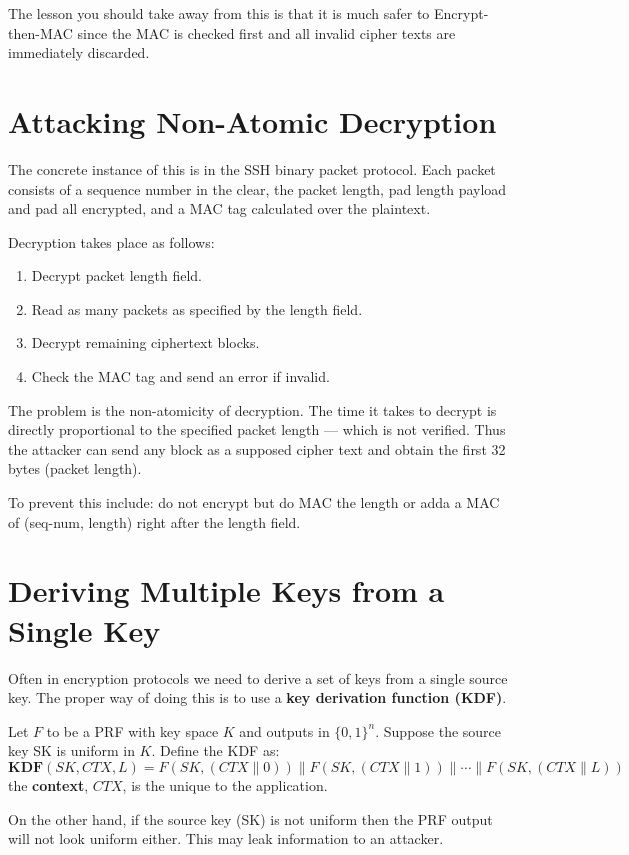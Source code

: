 \documentclass[twoside]{article}
\begin{document}
The lesson you should take away from this is that it is much safer to Encrypt-then-MAC since the MAC is checked first and all invalid cipher texts are immediately discarded.

\section{Attacking Non-Atomic Decryption}

The concrete instance of this is in the SSH binary packet protocol. Each packet consists of a sequence number in the clear, the packet length, pad length payload and pad all encrypted, and a MAC tag calculated over the plaintext.

Decryption takes place as follows:
\begin{enumerate}
\item Decrypt packet length field.
\item Read as many packets as specified by the length field.
\item Decrypt remaining ciphertext blocks.
\item Check the MAC tag and send an error if invalid.
\end{enumerate}

The problem is the non-atomicity of decryption. The time it takes to decrypt is directly proportional to the specified packet length --- which is not verified. Thus the attacker can send any block as a supposed cipher text and obtain the first 32 bytes (packet length).

To prevent this include: do not encrypt but do MAC the length or adda a MAC of (seq-num, length) right after the length field.

\section{Deriving Multiple Keys from a Single Key}

Often in encryption protocols we need to derive a set of keys from a single source key. The proper way of doing this is to use a \textbf{key derivation function (KDF)}.

Let $F$ to be a PRF with key space $K$ and outputs in $\{0, 1\}^n$. Suppose the source key SK is uniform in $K$. Define the KDF as:
\[\mathbf{KDF}( SK, CTX, L ) = F(SK, (CTX \parallel 0)) \parallel F(SK, (CTX \parallel 1)) \parallel \cdots \parallel F(SK, (CTX \parallel L))\]
the \textbf{context}, $CTX$, is the unique to the application.

On the other hand, if the source key (SK) is not uniform then the PRF output will not look uniform either. This may leak information to an attacker. 
\end{document}
